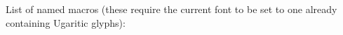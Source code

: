 \documentclass{article}
\begin{document}
\bigskip
List of named macros (these require the current font to be set to one already containing Ugaritic glyphs):

\par
{}\par
{}\par
{}\par
{}\par
{}\par
{}\par
{}\par
{}\par
{}\par
{}\par
{}\par
{}\par
{}\par
{}\par
{}\par
{}\par
{}\par
{}\par
{}\par
{}\par
{}\par
{}\par
{}\par
{}\par
{}\par
{}\par
{}\par
{}\par
{}\par
{}\par
{}\par
{}\par
{}\par
{}\par
\end{document}
